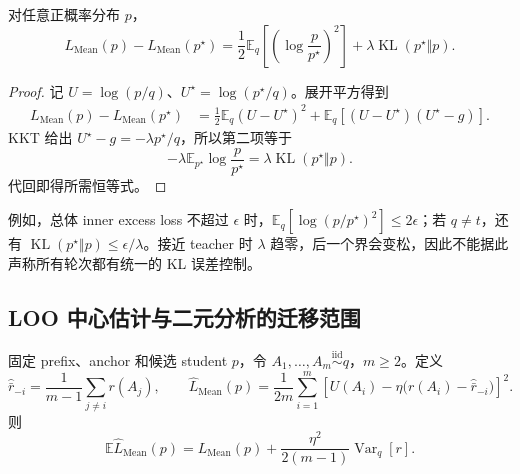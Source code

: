 \documentclass[lang=cn,scheme=chinese,openany]{../book/elegantbook}
\newcommand{\E}{\mathbb E}
\newcommand{\KL}{\operatorname{KL}}
\newcommand{\Var}{\operatorname{Var}}
\begin{document}
\begin{proposition}
\label{dyn:prop:mean-opd-excess-identity}
对任意正概率分布 $p$，
\begin{equation}
 L_{\mathrm{Mean}}(p)-L_{\mathrm{Mean}}(p^\star)
 =\frac12\E_q\left[\left(\log\frac p{p^\star}\right)^2\right]
       +\lambda\KL(p^\star\Vert p).
 \label{dyn:eq:mean-opd-excess-identity}
\end{equation}
\end{proposition}

\begin{proof}
记 $U=\log(p/q)$、$U^\star=\log(p^\star/q)$。展开平方得到
\begin{align*}
 L_{\mathrm{Mean}}(p)-L_{\mathrm{Mean}}(p^\star)
 &=\frac12\E_q(U-U^\star)^2
   +\E_q[(U-U^\star)(U^\star-g)].
\end{align*}
KKT 给出 $U^\star-g=-\lambda p^\star/q$，所以第二项等于
\begin{equation*}
 -\lambda\E_{p^\star}\log\frac p{p^\star}
 =\lambda\KL(p^\star\Vert p).
\end{equation*}
代回即得所需恒等式。
\end{proof}

例如，总体 inner excess loss 不超过 $\epsilon$ 时，$\E_q[\log(p/p^\star)^2]\le2\epsilon$；若 $q\ne t$，还有 $\KL(p^\star\Vert p)\le\epsilon/\lambda$。接近 teacher 时 $\lambda$ 趋零，后一个界会变松，因此不能据此声称所有轮次都有统一的 KL 误差控制。

\subsection{LOO 中心估计与二元分析的迁移范围}

\begin{proposition}
\label{dyn:prop:mean-opd-loo-expectation}
固定 prefix、anchor 和候选 student $p$，令 $A_1,\ldots,A_m\overset{\mathrm{iid}}\sim q$，$m\ge2$。定义
\begin{equation*}
 \widehat{\bar r}_{-i}=\frac1{m-1}\sum_{j\ne i}r(A_j),
 \qquad
 \widehat L_{\mathrm{Mean}}(p)
 =\frac1{2m}\sum_{i=1}^m
 \left[U(A_i)-\eta\bigl(r(A_i)-\widehat{\bar r}_{-i}\bigr)\right]^2.
\end{equation*}
则
\begin{equation}
 \E\widehat L_{\mathrm{Mean}}(p)
 =L_{\mathrm{Mean}}(p)
  +\frac{\eta^2}{2(m-1)}\Var_q[r].
 \label{dyn:eq:mean-opd-loo-expectation}
\end{equation}
\end{proposition}
\end{document}
